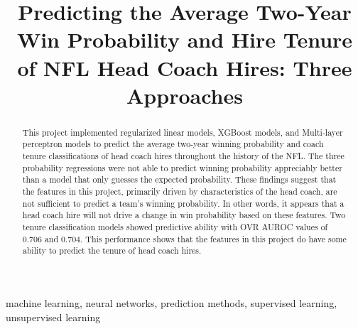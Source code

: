 \documentclass[conference]{IEEEtran}
\begin{document}
\title{Predicting the Average Two-Year Win Probability and Hire Tenure of NFL Head Coach Hires: Three Approaches}

\author{
}

\maketitle

\begin{abstract}
This project implemented regularized linear models, XGBoost models, and Multi-layer perceptron models to predict the average two-year winning probability and coach tenure classifications of head coach hires throughout the history of the NFL. The three probability regressions were not able to predict winning probability appreciably better than a model that only guesses the expected probability. These findings suggest that the features in this project, primarily driven by characteristics of the head coach, are not sufficient to predict a team's winning probability. In other words, it appears that a head coach hire will not drive a change in win probability based on these features. Two tenure classification models showed predictive ability with OVR AUROC values of 0.706 and 0.704. This performance shows that the features in this project do have some ability to predict the tenure of head coach hires.

\end{abstract}

\begin{IEEEkeywords}
machine learning, neural networks, prediction methods, supervised learning, unsupervised learning
\end{IEEEkeywords}
\end{document}
